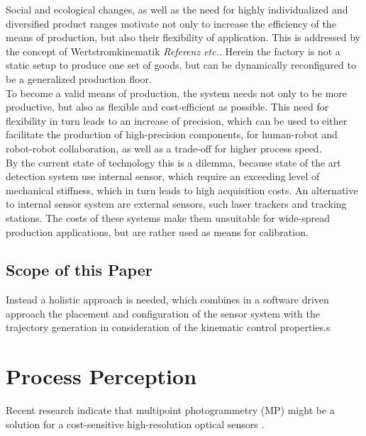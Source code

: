 \documentclass[5p,times,procedia]{elsarticle}
\begin{document}
Social and ecological changes, as well as the need for
highly individualized and diversified product ranges
motivate not only to increase the efficiency of the means
of production, but also their flexibility of application.
This is addressed by the concept of Wertstromkinematik \textit{Referenz etc.}.
Herein the factory is not a static setup to produce
one set of goods, but can be dynamically reconfigured to be a generalized production floor.\\
To become a valid means of production, the system needs not only to
be more productive, but also as flexible and cost-efficient as possible. This need for flexibility in turn leads to an increase of precision, which can be used to either facilitate the production of high-precision components, for human-robot and robot-robot collaboration, as well as a trade-off for higher process speed.\\
By the current state of technology this is a dilemma, because state of the art detection system use internal sensor, which require an exceeding level of mechanical stiffness, which in turn leads to high
acquisition costs. An alternative to internal sensor system are external sensors, such laser trackers and tracking stations. The costs of these systems make them unsuitable for wide-spread production applications, but are rather used as means for calibration.\\

\subsection{Scope of this Paper}

Instead a holistic approach is needed, which combines in a software driven approach the placement and configuration of the sensor system with the trajectory generation in consideration of the kinematic control properties.s

\lipsum[1-1]


\section{Process Perception}

Recent research indicate that multipoint photogrammetry (MP) might be a solution for a cost-sensitive high-resolution optical sensors \cite{Hartlieb_2021}.
\end{document}
